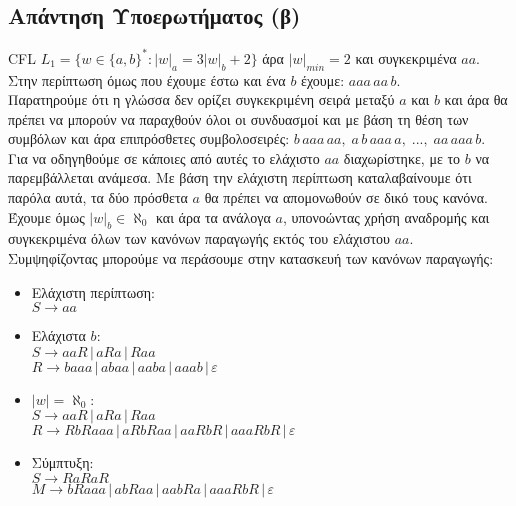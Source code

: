 \subsection{Απάντηση Υποερωτήματος (β)}
\label{ssec:Solution_1.2}
\doublespacing

CFL
$ L_1 = \{w \in \{a, b\}^* : |w|_a = 3|w|_b + 2 \}$
άρα $\vert w \vert_{min} = 2$ και συγκεκριμένα $aa$.\\
Στην περίπτωση όμως που έχουμε έστω και ένα $b$ έχουμε:
$aaa\,aa\,b$.\\
Παρατηρούμε ότι η γλώσσα δεν ορίζει συγκεκριμένη σειρά μεταξύ $a$ και
$b$ και άρα θα πρέπει να μπορούν να παραχθούν όλοι οι συνδυασμοί και με βάση τη θέση των συμβόλων και άρα
επιπρόσθετες συμβολοσειρές: $b\,aaa\,aa,\; a\,b\,aaa\,a,\;...,\;
aa\,aaa\,b$.\\
Για να οδηγηθούμε σε κάποιες από αυτές το ελάχιστο $aa$ διαχωρίστηκε, με το $b$ να παρεμβάλλεται ανάμεσα.
Με βάση την ελάχιστη περίπτωση καταλαβαίνουμε ότι παρόλα αυτά, τα δύο πρόσθετα $a$ θα πρέπει να απομονωθούν σε δικό
τους κανόνα.\\
Έχουμε όμως $|w|_b \in \aleph_0$ και άρα τα ανάλογα $a$, υπονοώντας χρήση αναδρομής και συγκεκριμένα όλων των
κανόνων παραγωγής εκτός του ελάχιστου $aa$.\\
Συμψηφίζοντας μπορούμε να περάσουμε στην κατασκευή των κανόνων παραγωγής:
\reducevspace\reducevspace\reducevspace\reducevspace\reducevspace\reducevspace\reducevspace
\reducevspace\reducevspace\reducevspace\reducevspace\reducevspace\reducevspace\reducevspace
\begin{itemize}
	\itemsep0em

	\item Ελάχιστη περίπτωση:\\\reducevspace
	$S \rightarrow aa$
\reducevspace\reducevspace\reducevspace\reducevspace\reducevspace\reducevspace\reducevspace
	\item Ελάχιστα $b$:\\\reducevspace
	$S \rightarrow aaR \,|\, aRa \,|\, Raa$\\\reducevspace
	$R \rightarrow baaa \,|\, abaa \,|\, aaba \,|\, aaab \,|\, \varepsilon$\\
\reducevspace\reducevspace\reducevspace\reducevspace\reducevspace\reducevspace\reducevspace
	\item $|w| = \aleph_0$:\\\reducevspace
	$S \rightarrow aaR \,|\, aRa \,|\, Raa$\\\reducevspace
	$R \rightarrow RbRaaa \,|\, aRbRaa \,|\, aaRbR \,|\, aaaRbR \,|\, \varepsilon$\\
\reducevspace\reducevspace\reducevspace\reducevspace\reducevspace\reducevspace\reducevspace
	\item Σύμπτυξη:\\\reducevspace
	$S \rightarrow RaRaR$\\\reducevspace
	$M \rightarrow bRaaa \,|\, abRaa \,|\, aabRa \,|\, aaaRbR \,|\, \varepsilon$\\
\end{itemize}

